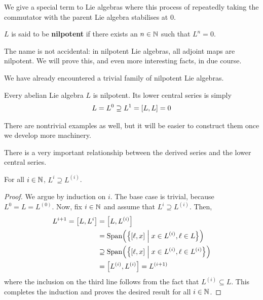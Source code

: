 We give a special term to Lie algebras where this process of repeatedly taking the commutator with the parent Lie algebra stabilises at $0$.

\begin{boxdefinition}[Nilpotency]
    $L$ is said to be \textbf{nilpotent} if there exists an $n \in \mathbb{N}$ such that $L^{n} = 0$.
\end{boxdefinition}

The name is not accidental: in nilpotent Lie algebras, all adjoint maps are nilpotent. We will prove this, and even more interesting facts, in due course.

We have already encountered a trivial family of nilpotent Lie algebras.

\begin{boxexample}
    Every abelian Lie algebra $L$ is nilpotent. Its lower central series is simply
    \begin{align*}
        L = L^{0} \supseteq L^{1} = \left[ L, L \right] = 0
    \end{align*}
\end{boxexample}

There are nontrivial examples as well, but it will be easier to construct them once we develop more machinery.

There is a very important relationship between the derived series and the lower central series.

\begin{boxlemma}\label{Ch1:Lemma:DerivedSeriesContainedInLowerCentralSeries}
    For all $i \in \mathbb{N}$, $L^i \supseteq L^{(i)}$.
\end{boxlemma}
\begin{proof}
    We argue by induction on $i$. The base case is trivial, because $L^0 = L = L^{(0)}$. Now, fix $i \in \mathbb{N}$ and assume that $L^i \supseteq L^{(i)}$. Then,
    \begin{align*}
        L^{i + 1}
        = \left[ L, L^i \right] &= \left[ L, L^{(i)} \right] \\
        &= \operatorname{Span}\!\left( \left\{ \left[ \ell, x \right] \; \middle\vert \; x \in L^{(i)}, \ell \in L \right\} \right) \\
        &\supseteq \operatorname{Span}\!\left( \left\{ \left[ \ell, x \right] \; \middle\vert \; x \in L^{(i)}, \ell \in L^{(i)} \right\} \right) \\
        &= \left[ L^{(i)}, L^{(i)} \right] = L^{(i + 1)}
    \end{align*}
    where the inclusion on the third line follows from the fact that $L^{(i)} \subseteq L$. This completes the induction and proves the desired result for all $i \in \mathbb{N}$.
\end{proof}

